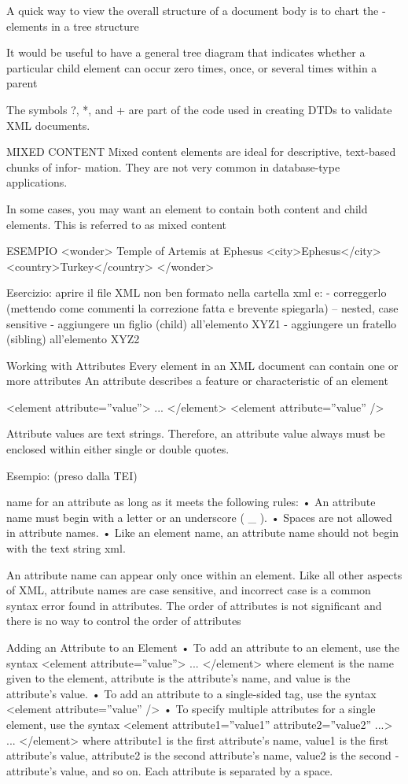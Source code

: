 A quick way to view the overall structure of a document body is to chart the ­elements
in a tree structure

It would be useful to have a general tree diagram that indicates whether a particular
child element can occur zero times, once, or several times within a parent

The symbols ?, *, and + are part of the code used in creating DTDs to validate XML
documents.

MIXED CONTENT
Mixed content elements are ideal for
descriptive, text-based chunks of infor-
mation. They are not very common in
database-type applications.

In some cases, you may want an element to
contain both content and child elements.
This is referred to as mixed content

ESEMPIO
<wonder>
Temple of Artemis at Ephesus
<city>Ephesus</city>
<country>Turkey</country>
</wonder>

Esercizio:
aprire il file XML non ben formato nella cartella xml e:
- correggerlo (mettendo come commenti la correzione fatta e brevente spiegarla)
-- nested, case sensitive
- aggiungere un figlio (child) all'elemento XYZ1
- aggiungere un fratello (sibling) all'elemento XYZ2

Working with Attributes
Every element in an XML document can contain one or more attributes
An attribute
describes a feature or characteristic of an element

<element attribute=”value”> ... </element>
<element attribute=”value” />

Attribute values are text strings. Therefore, an attribute value always must be enclosed
within either single or double quotes.

Esempio:
(preso dalla TEI)

name for an attribute as long as it meets the following rules:
• An attribute name must begin with a letter or an underscore ( \_ ).
• Spaces are not allowed in attribute names.
• Like an element name, an attribute name should not begin with the text string xml.

An attribute name can appear only once within an element. Like all other aspects of
XML, attribute names are case sensitive, and incorrect case is a common syntax error
found in attributes.
The order of attributes is not significant and there is no way to control the order of attributes

Adding an Attribute to an Element
• To add an attribute to an element, use the syntax
<element attribute=”value”> ... </element>
where element is the name given to the element, attribute is the ­attribute’s
name, and value is the attribute’s value.
• To add an attribute to a single-sided tag, use the syntax
<element attribute=”value” />
• To specify multiple attributes for a single element, use the syntax
<element attribute1=”value1” attribute2=”value2” ...> ... </element>
where attribute1 is the first attribute’s name, value1 is the first attribute’s value,
attribute2 is the second attribute’s name, value2 is the second ­attribute’s
value, and so on. Each attribute is separated by a space.

